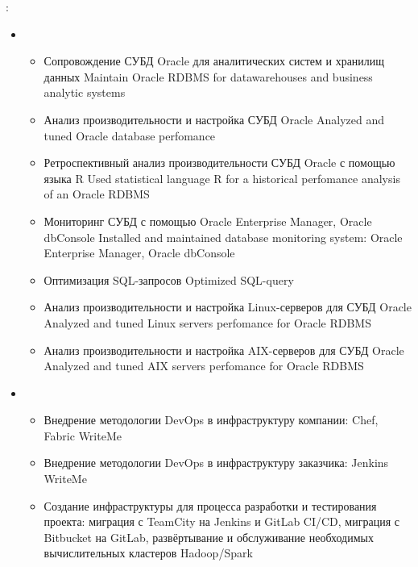 \documentclass[11pt,a4paper,sans]{moderncv}        %
\begin{document}
{\protect{}}
{}
{}
{
	\achievements:
	\begin{itemize}
		\item {}
		\begin{itemize}
			\item {}
				{Сопровождение СУБД Oracle для аналитических систем и хранилищ данных}
				{Maintain Oracle RDBMS for datawarehouses and business analytic systems}
			\item {}
				{Анализ производительности и настройка СУБД Oracle}
				{Analyzed and tuned Oracle database perfomance}
			\item {}
				{Ретроспективный анализ производительности СУБД Oracle с помощью языка R}
				{Used statistical language R for a historical perfomance analysis of an Oracle RDBMS}
			\item {}
				{Мониторинг СУБД с помощью Oracle Enterprise Manager, Oracle dbConsole}
				{Installed and maintained database monitoring system: Oracle Enterprise Manager, Oracle dbConsole}
			\item {}
				{Оптимизация SQL-запросов}
				{Optimized SQL-query}
			\item {}
				{Анализ производительности и настройка Linux-серверов для СУБД Oracle}
				{Analyzed and tuned Linux servers perfomance for Oracle RDBMS}
			\item {}
				{Анализ производительности и настройка AIX-серверов для СУБД Oracle}
				{Analyzed and tuned AIX servers perfomance for Oracle RDBMS}
		\end{itemize}
		\item {}
		\begin{itemize}
			\item {}
			{Внедрение методологии DevOps в инфраструктуру компании: Chef, Fabric}
			{WriteMe}
			\item {}
			{Внедрение методологии DevOps в инфраструктуру заказчика: Jenkins}
			{WriteMe}
			\item {}
			{Создание инфраструктуры для процесса разработки и тестирования проекта: миграция с TeamCity на Jenkins и GitLab CI/CD, миграция с Bitbucket на GitLab, развёртывание и обслуживание необходимых вычислительных кластеров Hadoop/Spark}

\end{itemize}
\end{itemize}}
\end{document}
